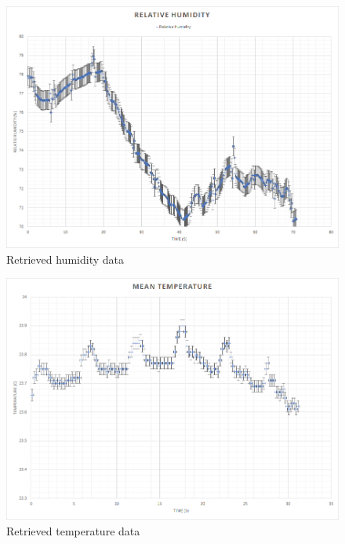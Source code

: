 \documentclass[]{report}
\begin{document}
	\begin{figure}[h]
		\hfill\includegraphics[scale=0.7]{hum_fin.png}\hspace*{\fill}
		\caption{Retrieved humidity data}
		\label{rh}
	\end{figure}

	\begin{figure}[h]
		\hfill\includegraphics[scale=0.7]{temp_fin.png}\hspace*{\fill}
		\caption{Retrieved temperature data}
		\label{rt}
	\end{figure}
\end{document}
